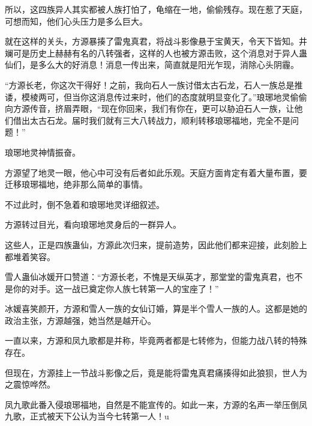 \begin{this_body}
所以，这四族异人其实都被人族打怕了，龟缩在一地，偷偷残存。现在惹了天庭，可想而知，他们心头压力是多么巨大。

就在这样的关头，方源暴揍了雷鬼真君，将战斗影像悬于宝黄天，令天下皆知。井斓可是历史上赫赫有名的八转强者，这样的人也被方源击败，这个消息对于异人蛊仙们，是多么大的好消息！消息一传出来，简直就是阳光乍现，消除心头阴霾。

“方源长老，你这次干得好！之前，我向石人一族讨借太古石龙，石人一族总是推诿，模棱两可，但当你这消息传过来时，他们的态度就明显变化了。”琅琊地灵偷偷向方源传音，挤眉弄眼，“现在你回来，我们有你在，更可以胁迫石人一族，让他们借出太古石龙。届时我们就有三大八转战力，顺利转移琅琊福地，完全不是问题！”

琅琊地灵神情振奋。

方源望了地灵一眼，他心中可没有后者如此乐观。天庭方面肯定有着大量布置，要迁移琅琊福地，绝非那么简单的事情。

不过此时，倒不急着和琅琊地灵详细叙述。

方源转过目光，看向琅琊地灵身后的一群异人。

这些人，正是四族蛊仙，方源此次归来，提前造势，因此他们都来迎接，此刻脸上都堆着笑容。

雪人蛊仙冰媛开口赞道：“方源长老，不愧是天纵英才，那堂堂的雷鬼真君，也不是你的对手。这一战已奠定你人族七转第一人的宝座了！”

冰媛喜笑颜开，方源和雪人一族的女仙订婚，算是半个雪人一族的人。这都是她的政治主张，方源越强，她当然是越开心。

一直以来，方源和凤九歌都是并称，毕竟两者都是七转修为，但能力战八转的特殊存在。

但现在，方源挂上一节战斗影像之后，竟是能将雷鬼真君痛揍得如此狼狈，世人为之震惊哗然。

凤九歌此番入侵琅琊福地，自然是不能宣传的。如此一来，方源的名声一举压倒凤九歌，正式被天下公认为当今七转第一人！u

\end{this_body}

